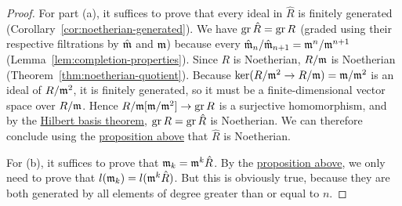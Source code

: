 \begin{proof}
    For part (a), it suffices to prove that every ideal in \(\hat{R}\) is finitely generated (Corollary~\ref{cor:noetherian-generated}).
    We have \(\operatorname{gr} \hat{R} = \operatorname{gr} R\) (graded using their respective filtrations by \(\hat{\mathfrak{m}}\) and \(\mathfrak{m}\))
    because every \(\hat{\mathfrak{m}}_n/\hat{\mathfrak{m}}_{n+1} = \mathfrak{m}^n/\mathfrak{m}^{n+1}\) (Lemma~\ref{lem:completion-properties}).
    Since \(R\) is Noetherian, \(R/\mathfrak{m}\) is Noetherian (Theorem~\ref{thm:noetherian-quotient}).
    Because \(\ker(R/\mathfrak{m}^2 \to R/\mathfrak{m}) = \mathfrak{m}/\mathfrak{m}^2\) is an ideal of \(R/\mathfrak{m}^2\),
    it is finitely generated, so it must be a finite-dimensional vector space over \(R/\mathfrak{m}\).
    Hence \(R/\mathfrak{m}[\mathfrak{m}/\mathfrak{m}^2] \to \operatorname{gr} R\) is a surjective homomorphism,
    and by the \hyperref[cor:hilbert-basis]{Hilbert basis theorem}, \(\operatorname{gr} R = \operatorname{gr} \hat{R}\) is Noetherian.
    We can therefore conclude using the \hyperref[prop:graded-ring-generators]{proposition above}
    that \(\hat{R}\) is Noetherian.

    For (b), it suffices to prove that \(\mathfrak{m}_k = \mathfrak{m}^k\hat{R}\).
    By the \hyperref[prop:graded-ring-generators]{proposition above},
    we only need to prove that \(l(\mathfrak{m}_k) = l(\mathfrak{m}^k\hat{R})\).
    But this is obviously true, because they are both generated by all elements of degree greater than or equal to \(n\).
\end{proof}

